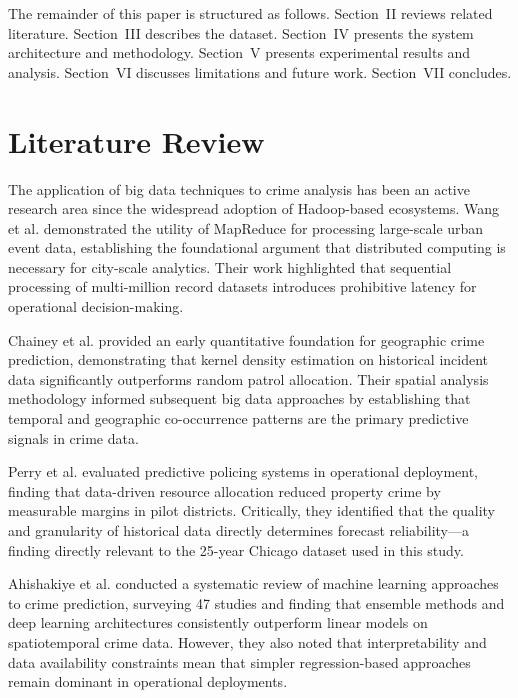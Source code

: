 \documentclass[conference]{IEEEtran}
\begin{document}
The remainder of this paper is structured as follows. Section~II reviews related
literature. Section~III describes the dataset. Section~IV presents the system
architecture and methodology. Section~V presents experimental results and analysis.
Section~VI discusses limitations and future work. Section~VII concludes.

\section{Literature Review}

The application of big data techniques to crime analysis has been an active research
area since the widespread adoption of Hadoop-based ecosystems. Wang et al. \cite{wang2013}
demonstrated the utility of MapReduce for processing large-scale urban event data,
establishing the foundational argument that distributed computing is necessary for
city-scale analytics. Their work highlighted that sequential processing of multi-million
record datasets introduces prohibitive latency for operational decision-making.

Chainey et al. \cite{chainey2008} provided an early quantitative foundation for
geographic crime prediction, demonstrating that kernel density estimation on historical
incident data significantly outperforms random patrol allocation. Their spatial analysis
methodology informed subsequent big data approaches by establishing that temporal and
geographic co-occurrence patterns are the primary predictive signals in crime data.

Perry et al. \cite{perry2013} evaluated predictive policing systems in operational
deployment, finding that data-driven resource allocation reduced property crime by
measurable margins in pilot districts. Critically, they identified that the quality
and granularity of historical data directly determines forecast reliability---a finding
directly relevant to the 25-year Chicago dataset used in this study.

Ahishakiye et al. \cite{ahishakiye2021} conducted a systematic review of machine
learning approaches to crime prediction, surveying 47 studies and finding that
ensemble methods and deep learning architectures consistently outperform linear
models on spatiotemporal crime data. However, they also noted that interpretability
and data availability constraints mean that simpler regression-based approaches
remain dominant in operational deployments.
\end{document}
